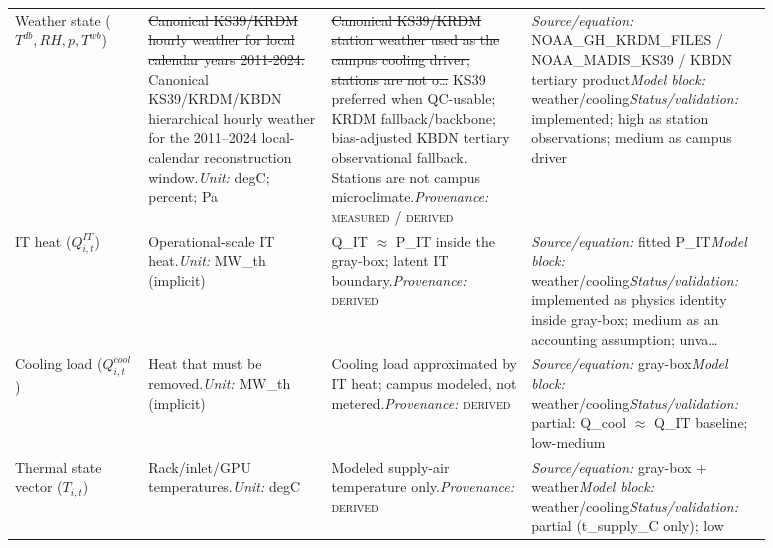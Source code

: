 \documentclass[11pt]{article}
\newcommand{\oldtxt}[1]{\textcolor{blue!70!black}{\sout{#1}}}
\newcommand{\latesttxt}[1]{\textcolor{purple!85!black}{#1}}
\newcommand{\Measured}{\textsc{measured}}
\newcommand{\Derived}{\textsc{derived}}
\begin{document}
\begin{longtable}{@{}p{0.16\linewidth}p{0.22\linewidth}p{0.24\linewidth}p{0.26\linewidth}@{}}
Weather state ($T^{db}, RH, p, T^{wb}$) & \oldtxt{Canonical KS39/KRDM hourly weather for local calendar years 2011-2024.} \latesttxt{Canonical KS39/KRDM/KBDN hierarchical hourly weather for the 2011--2024 local-calendar reconstruction window.}\newline \textit{Unit:} degC; percent; Pa & \oldtxt{Canonical KS39/KRDM station weather used as the campus cooling driver; stations are not o\ldots} \latesttxt{KS39 preferred when QC-usable; KRDM fallback/backbone; bias-adjusted KBDN tertiary observational fallback. Stations are not campus microclimate.}\newline \textit{Provenance:} \Measured{} / \Derived{} & \textit{Source/equation:} NOAA\_GH\_KRDM\_FILES / NOAA\_MADIS\_KS39 / KBDN tertiary product\newline \textit{Model block:} weather/cooling\newline \textit{Status/validation:} implemented; high as station observations; medium as campus driver\\
IT heat ($Q^{IT}_{i,t}$) & Operational-scale IT heat.\newline \textit{Unit:} MW\_th (implicit) & Q\_IT $\approx$ P\_IT inside the gray-box; latent IT boundary.\newline \textit{Provenance:} \Derived{} & \textit{Source/equation:} fitted P\_IT\newline \textit{Model block:} weather/cooling\newline \textit{Status/validation:} implemented as physics identity inside gray-box; medium as an accounting assumption; unva\ldots\\
Cooling load ($Q^{cool}_{i,t}$) & Heat that must be removed.\newline \textit{Unit:} MW\_th (implicit) & Cooling load approximated by IT heat; campus modeled, not metered.\newline \textit{Provenance:} \Derived{} & \textit{Source/equation:} gray-box\newline \textit{Model block:} weather/cooling\newline \textit{Status/validation:} partial: Q\_cool $\approx$ Q\_IT baseline; low-medium\\
Thermal state vector ($T_{i,t}$) & Rack/inlet/GPU temperatures.\newline \textit{Unit:} degC & Modeled supply-air temperature only.\newline \textit{Provenance:} \Derived{} & \textit{Source/equation:} gray-box + weather\newline \textit{Model block:} weather/cooling\newline \textit{Status/validation:} partial (t\_supply\_C only); low\\

\end{longtable}
\end{document}
